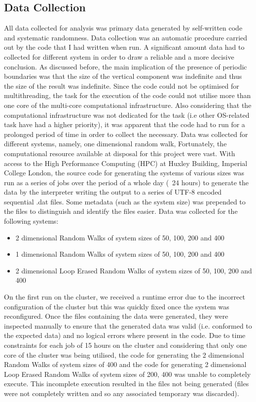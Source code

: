\documentclass{article}
\begin{document}
\subsection{Data Collection}
	 All data collected for analysis was primary data generated by self-written code and systematic randomness.  Data collection was an automatic procedure carried out by the code that I had written when run. A significant amount data had to collected for different system in order to draw a reliable and a more decisive conclusion. As discussed before, the main implication of the presence of periodic boundaries was that the size of the vertical component was indefinite and thus the size of the result was indefinite. Since the code could not be optimised for multithreading, the task for the execution of the code could not utilise more than one core of the multi-core computational infrastructure. Also considering that the computational infrastructure was not dedicated for the task (i.e other OS-related task have had a higher priority), it was apparent that the code had to run for a prolonged period of time in order to collect the necessary. Data was collected for different systems, namely, one dimensional random walk,
\newline
Fortunately, the computational resource available at disposal for this project were vast. With access to the High Performance Computing (HPC) at Huxley Building, Imperial College London, the source code for generating the systems of various sizes was run as a series of jobs over the period of a whole day (~24 hours) to generate the data by the interpreter writing the output to a series of UTF-8 encoded sequential .dat files. Some metadata (such as the system size) was prepended to the files to distinguish and identify the files easier.
\newline
Data was collected for the following systems:
\begin{itemize}
	\item 2 dimensional Random Walks of system sizes of 50, 100, 200 and 400
	\item 1 dimensional Random Walks of system sizes of 50, 100, 200 and 400
	\item 2 dimensional Loop Erased Random Walks of system sizes of 50, 100, 200 and 400
\end{itemize}
On the first run on the cluster, we received a runtime error due to the incorrect configuration of the cluster but this was quickly fixed once the system was reconfigured. Once the files containing the data were generated, they were inspected manually to ensure that the generated data was valid (i.e. conformed to the expected data) and no logical errors where present in the code. Due to time constraints for each job of 15 hours on the cluster and considering that only one core of the cluster was being utilised, the code for generating the 2 dimensional Random Walks of system sizes of 400 and the code for generating 2 dimensional Loop Erased Random Walks of system sizes of 200, 400 was unable to completely execute. This incomplete execution resulted in the files not being generated (files were not completely written and so any associated temporary was discarded).
\end{document}
